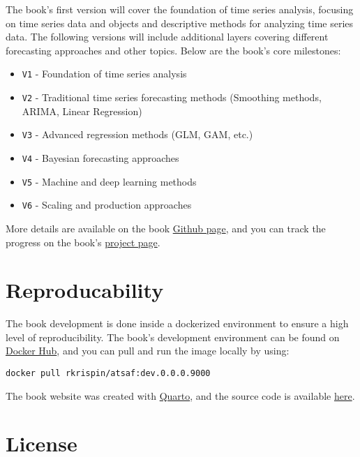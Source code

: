 \documentclass[
  letterpaper,
  DIV=11,
  numbers=noendperiod]{scrreprt}
\providecommand{\tightlist}{%
  \setlength{\itemsep}{0pt}\setlength{\parskip}{0pt}}\usepackage{longtable,booktabs,array}
\begin{document}
The book's first version will cover the foundation of time series
analysis, focusing on time series data and objects and descriptive
methods for analyzing time series data. The following versions will
include additional layers covering different forecasting approaches and
other topics. Below are the book's core milestones:

\begin{itemize}
\tightlist
\item
  \texttt{V1} - Foundation of time series analysis
\item
  \texttt{V2} - Traditional time series forecasting methods (Smoothing
  methods, ARIMA, Linear Regression)
\item
  \texttt{V3} - Advanced regression methods (GLM, GAM, etc.)
\item
  \texttt{V4} - Bayesian forecasting approaches
\item
  \texttt{V5} - Machine and deep learning methods
\item
  \texttt{V6} - Scaling and production approaches
\end{itemize}

More details are available on the book
\href{https://github.com/RamiKrispin/atsaf\#table-of-contents}{Github
page}, and you can track the progress on the book's
\href{https://github.com/users/RamiKrispin/projects/4}{project page}.

\hypertarget{reproducability}{%
\section*{Reproducability}\label{reproducability}}

The book development is done inside a dockerized environment to ensure a
high level of reproducibility. The book's development environment can be
found on
\href{https://hub.docker.com/repository/docker/rkrispin/atsaf}{Docker
Hub}, and you can pull and run the image locally by using:

\begin{verbatim}
docker pull rkrispin/atsaf:dev.0.0.0.9000
\end{verbatim}

The book website was created with \href{https://quarto.org/}{Quarto},
and the source code is available
\href{https://github.com/RamiKrispin/atsaf}{here}.

\hypertarget{license}{%
\section*{License}\label{license}}
\end{document}
